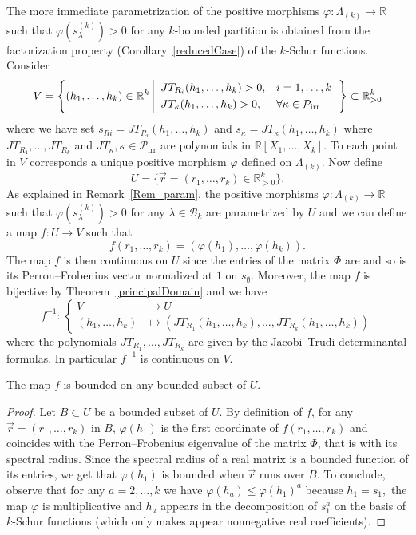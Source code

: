 \documentclass[ALCO,ThmDefs,Unicode,epreuves]{cedram}
\DeclareMathOperator{\irr}{irr}
\begin{document}
\label{SubSec_Twoparam}The more immediate parametrization of the positive
morphisms $\varphi:\Lambda_{(k)}\rightarrow\mathbb{R}$ such that
$\varphi(s_{\lambda}^{(k)})>0$ for any $k$-bounded partition is obtained from
the factorization property (Corollary~\ref{reducedCase}) of the $k$-Schur
functions. Consider
\[
V=\left\{ (h_{1},\ldots,h_{k})\in\mathbb{R}^{k}\left\vert
\begin{array}[c]{ll}
%
JT_{R_{i}}(h_{1},\ldots,h_{k})>0,&i=1,\ldots,k\\[3pt]
JT_{\kappa}(h_{1},\ldots,h_{k})>0, &\forall\kappa\in\mathcal{P}_{\irr }%
\end{array}\right.
\right\} \subset\mathbb{R}_{>0}^{k}%
\]
where we have set $s_{Ri}=JT_{R_{i}}(h_{1},\ldots,h_{k})$ and $s_{\kappa
}=JT_{\kappa}(h_{1},\ldots,h_{k})$ where $JT_{R_{1}},\ldots,JT_{R_{k}}$ and
$JT_{\kappa},\kappa\in\mathcal{P}_{\irr }$ are polynomials in
$\mathbb{R}[X_{1},\ldots,X_{k}]$. To each point in $V$ corresponds a unique
positive morphism $\varphi$ defined on $\Lambda_{(k)}$. Now define%
\[
U=\{\vec{r}=(r_{1},\ldots,r_{k})\in\mathbb{R}_{>0}^{k}\}.
\]
As explained in Remark~\ref{Rem_param}, the positive morphisms $\varphi
:\Lambda_{(k)}\rightarrow\mathbb{R}$ such that $\varphi(s_{\lambda}^{(k)})>0$
for any $\lambda\in\mathcal{B}_{k}$ are parametrized by $U$ and we can define
a map $f:U\rightarrow V$ such that
\[
f(r_{1},\ldots,r_{k})=(\varphi(h_{1}),\ldots,\varphi(h_{k})).
\]
The map $f$ is then continuous on $U$ since the entries of the matrix $\Phi$
are and so is its Perron--Frobenius vector normalized at $1$ on $s_{\emptyset}%
$. Moreover, the map $f$ is bijective by Theorem~\ref{principalDomain} and we
have
\[
f^{-1}:\left\{
\begin{aligned}
V&\rightarrow U\\
(h_{1},\ldots,h_{k})&\mapsto(JT_{R_{1}}(h_{1},\ldots,h_{k}),\ldots,JT_{R_{k}%
}(h_{1},\ldots,h_{k}))
\end{aligned}
\right.
\]
where the polynomials $JT_{R_{1}},\ldots,JT_{R_{k}}$ are given by the
Jacobi--Trudi determinantal formulas. In particular $f^{-1}$ is continuous on
$V$.

\begin{lemma}
\label{Lemma_Bounded}The map $f$ is bounded on any bounded subset of $U$.
\end{lemma}

\begin{proof}
Let $B\subset U$ be a bounded subset of $U$. By definition of $f$, for any
$\vec{r}=(r_{1},\ldots,r_{k})$ in $B$, $\varphi(h_{1})$ is the first
coordinate of $f(r_{1},\ldots,r_{k})$ and coincides with the Perron--Frobenius
eigenvalue of the matrix $\Phi$, that is with its spectral radius. Since the
spectral radius of a real matrix is a bounded function of its entries, we get
that $\varphi(h_{1})$ is bounded when $\vec{r}$ runs over $B$. To conclude,
observe that for any $a=2,\ldots,k$ we have $\varphi(h_{a})\leq\varphi
(h_{1})^{a}$ because $h_{1}=s_{1},$ the map $\varphi$ is multiplicative and
$h_{a}$ appears in the decomposition of $s_{1}^{a}$ on the basis of $k$-Schur
functions (which only makes appear nonnegative real coefficients).
\end{proof}
\end{document}
